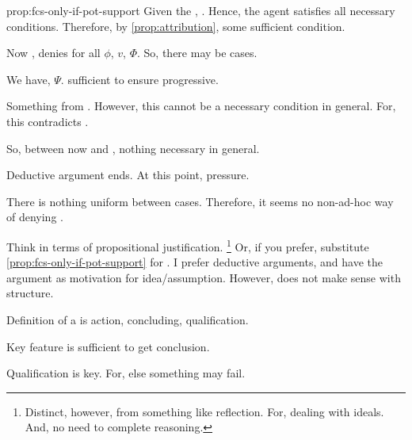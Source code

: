\begin{note}
\begin{argument}{prop:fcs-only-if-pot-support}
    \smallskip
    Given the \pevent{}, \ros{}.
    Hence, the agent satisfies all necessary conditions.
    Therefore, by \autoref{prop:attribution}, some sufficient condition.

    Now \supportII{}, denies for all \(\phi\), \(v\), \(\Phi\).
    So, there may be cases.

    We have, \(\Psi\).
    sufficient to ensure progressive.

    \smallskip
    Something from \pevent{}.
    However, this cannot be a necessary condition in general.
    For, this contradicts \supportII{}.

    So, between now and \pevent{}, nothing necessary in general.

    \smallskip
    Deductive argument ends.
    At this point, pressure.

    There is nothing uniform between cases.
    Therefore, it seems no non-ad-hoc way of denying \ros{}.
  \end{argument}

  Think in terms of propositional justification.%
  \footnote{
    Distinct, however, from something like reflection.
    For, dealing with ideals.
    And, no need to complete reasoning.
  }
  Or, if you prefer, substitute \autoref{prop:fcs-only-if-pot-support} for \supportII{}.
  I prefer deductive arguments, and have the argument as motivation for idea/assumption.
  However, does not make sense with structure.
\end{note}

\begin{note}
  Definition of a \fc{} is action, concluding, qualification.

  Key feature is sufficient to get conclusion.

  Qualification is key.
  For, else something may fail.
\end{note}

